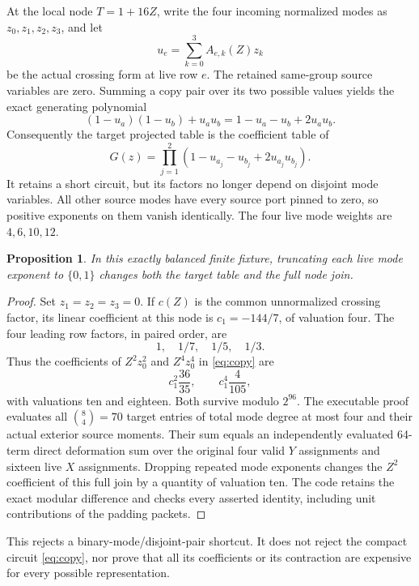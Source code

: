 \documentclass[11pt]{article}
\newtheorem{proposition}{Proposition}
\begin{document}
At the local node $T=1+16Z$, write the four incoming normalized modes as
$z_0,z_1,z_2,z_3$, and let
\[
 u_e=\sum_{k=0}^3 A_{e,k}(Z)z_k
\]
be the actual crossing form at live row $e$. The retained same-group
source variables are zero. Summing a copy pair over its two possible
values yields the exact generating polynomial
\[
 (1-u_a)(1-u_b)+u_a u_b
 =1-u_a-u_b+2u_a u_b.
\]
Consequently the target projected table is the coefficient table of
\begin{equation}
 G(z)=\prod_{j=1}^2 (1-u_{a_j}-u_{b_j}+2u_{a_j}u_{b_j}).
 \label{eq:copy}
\end{equation}
It retains a short circuit, but its factors no longer depend on disjoint
mode variables. All other source modes have every source port pinned to
zero, so positive exponents on them vanish identically. The four live
mode weights are $4,6,10,12$.

\begin{proposition}
In this exactly balanced finite fixture, truncating each live mode
exponent to $\{0,1\}$ changes both the target table and the full node join.
\end{proposition}
\begin{proof}
Set $z_1=z_2=z_3=0$. If $c(Z)$ is the common unnormalized crossing factor,
its linear coefficient at this node is $c_1=-144/7$, of valuation four.
The four leading row factors, in paired order, are
\[
 1,\quad 1/7,\quad 1/5,\quad 1/3.
\]
Thus the coefficients of $Z^2z_0^2$ and $Z^4z_0^4$ in \eqref{eq:copy} are
\[
 c_1^2\frac{36}{35},\qquad c_1^4\frac4{105},
\]
with valuations ten and eighteen. Both survive modulo $2^{96}$.
The executable proof evaluates all $\binom{8}{4}=70$ target entries
of total mode degree at most four and their actual exterior source
moments. Their sum equals an independently evaluated 64-term direct
deformation sum over the original four valid $Y$ assignments and sixteen
live $X$ assignments. Dropping repeated mode exponents changes the
$Z^2$ coefficient of this full join by a quantity of valuation ten.
The code retains the exact modular difference and checks every asserted
identity, including unit contributions of the padding packets.
\end{proof}

This rejects a binary-mode/disjoint-pair shortcut. It does not reject
the compact circuit \eqref{eq:copy}, nor prove that all its coefficients
or its contraction are expensive for every possible representation.
\end{document}

